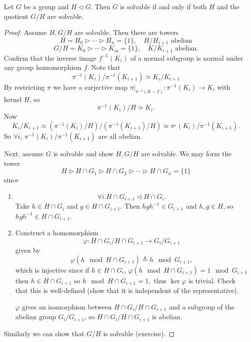\documentclass{article}
\begin{document}
\begin{prop}
Let $G$ be a group and $H \triangleleft G$. Then $G$ is solvable if
and only if both $H$ and the quotient $G / H$ are solvable.
\end{prop}
\begin{proof}
Assume $H, G / H$ are solvable. Then there are towers
$$
H = H_0 \triangleright \cdots \triangleright H_n = \{ 1 \}, \quad
H/H_{i+1} \text{ abelian} 
$$
$$
G/H = K_0 \triangleright \cdots \triangleright K_m = \{ 1 \}, \quad
K/K_{i+1} \text{ abelian}.
$$
Confirm that the inverse image $f^{-1}(K_i)$ of a normal subgroup is
normal under any group homomorphism $f$. Note that
$$
\pi^{-1}(K_i) / \pi^{-1}(K_{i+1}) \simeq K_i / K_{i+1}
$$
By restricting $\pi$ we have a surjective map
$\pi|_{\pi^{-1}(K-I)} : \pi^{-1}(K_i) \to K_i$ with kernel $H$,
so
$$
\pi^{-1}(K_i) / H \simeq K_i.
$$
Now
$$
K_i / K_{i+1} \simeq (\pi^{-1}(K_i) / H) / (\pi^{-1}(K_{i+1}) / H)
             \simeq \pi^{_1}(K_i) / \pi^{-1}(K_{i+1}).
$$
So $\forall i$, $\pi^{-1}(K_i) / \pi^{-1}(K_{i+1})$ are all abelian.

Next, assume $G$ is solvable and show $H, G/H$ are solvable.
We may form the tower
$$
H \triangleright H \cap G_1 
  \triangleright H \cap G_2 
  \triangleright \cdots 
  \triangleright H \cap G_n = \{ 1 \}
$$
since
\begin{enumerate}
  \item{
    $$
    \forall i . H \cap G_{i+1} \triangleleft H \cap G_i.
    $$
    Take $h \in H \cap G_i$ and $g \in H \cap G_{i+1}$.
    Then $h g h^{-1} \in G_{i+1}$ and $h, g \in H$, so
    $h g h^{-1} \in H \cap G_{i+1}$.
  }
  \item{
    Construct a homomorphism
    $$
    \varphi : H \cap G_i / H \cap G_{i+1} \to G_i / G_{i+1}
    $$
    given by 
    $$
    \varphi(h \mod H \cap G_{i+1}) \triangleq h \mod G_{i+1},
    $$
    which is injective since if $h \in H \cap G_i$,
    $\varphi(h \mod H \cap G_{i+1}) = 1 \mod G_{i+1}$ then
    $h \in H \cap G_{i+1}$ so
    $h \mod H \cap G_{i+1} = 1,$
    thus $\ker \varphi$ is trivial.
    Check that this is well-defined (show that it is independent of
    the representative).

    $\varphi$ gives an isomorphism between 
    $H \cap G_i / H \cap G_{i+1}$ and a subgroup of the abelian group
    $G_i / G_{i+1}$, so $H \cap G_i / H \cap G_{i+1}$ is abelian.
  }
\end{enumerate}
Similarly we can show that $G / H$ is solvable (exercise).
\end{proof}
\end{document}
